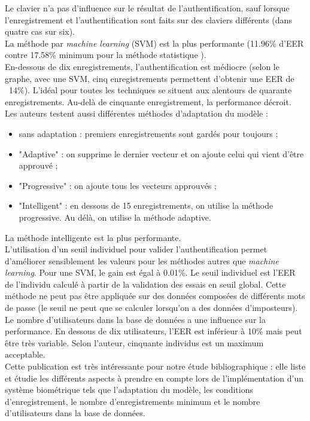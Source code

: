 Le clavier n'a pas d'influence sur le résultat de l'authentification, sauf lorsque l'enregistrement et l'authentification sont faits sur des claviers différents (dans quatre cas sur six).\\

La méthode par \textit{machine learning} (SVM) est la plus performante (11.96\% d'EER contre 17.58\% minimum pour la méthode statistique ).\\

En-dessous de dix enregistrements, l'authentification est médiocre (selon le graphe, avec une SVM, cinq enregistrements permettent d'obtenir une EER de ~14\%). L'idéal pour toutes les techniques se situent aux alentours de quarante enregistrements. Au-delà de cinquante enregistrement, la performance décroit.\\

Les auteurs testent aussi différentes méthodes d'adaptation du modèle :\\

\begin{itemize}
  \item sans adaptation : premiers enregistrements sont gardés pour toujours ;
  \item "Adaptive" : on supprime le dernier vecteur et on ajoute celui qui vient d'être approuvé ;
  \item "Progressive" : on ajoute tous les vecteurs approuvés ;
  \item "Intelligent" : en dessous de 15 enregistrements, on utilise la méthode progressive. Au délà, on utilise la méthode adaptive.
\end{itemize}

La méthode intelligente est la plus performante.\\

L'utilisation d'un seuil individuel pour valider l'authentification permet d'améliorer sensiblement les valeurs pour les méthodes autres que \textit{machine learning}. Pour une SVM, le gain est égal à 0.01\%. Le seuil individuel est l'EER de l'individu calculé à partir de la validation des essais en seuil global. Cette méthode ne peut pas être appliquée sur des données composées de différents mots de passe (le seuil ne peut que se calculer lorsqu'on a des données d'imposteurs).\\

Le nombre d'utilisateurs dans la base de données a une influence sur la performance. En dessous de dix utilisateurs, l'EER est inférieur à 10\% mais peut être très variable. Selon l'auteur, cinquante individus est un maximum acceptable.\\

Cette publication est très intéressante pour notre étude bibliographique : elle liste et étudie les différents aspects à prendre en compte lors de l'implémentation d'un système biométrique tels que l'adaptation du modèle, les conditions d'enregistrement, le nombre d'enregistrements minimum et le nombre d'utilisateurs dans la base de données.
